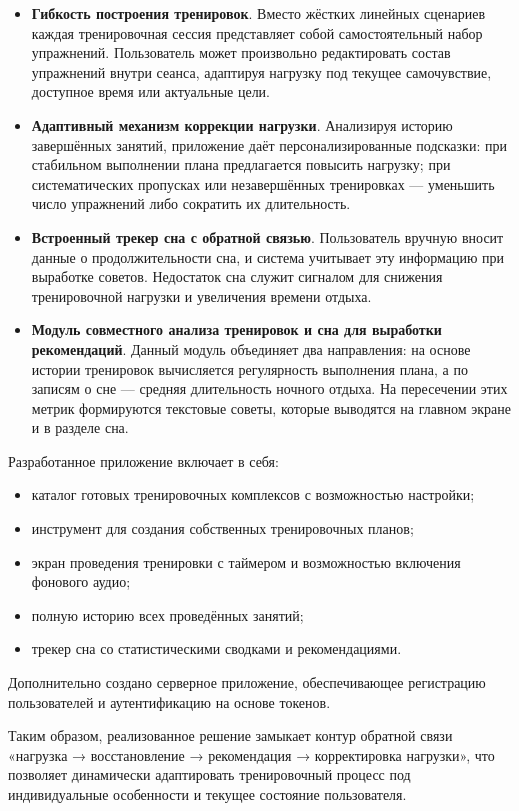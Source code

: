 \begin{itemize}
    \item \textbf{Гибкость построения тренировок}. Вместо жёстких линейных сценариев каждая тренировочная сессия представляет собой самостоятельный набор упражнений. Пользователь может произвольно редактировать состав упражнений внутри сеанса, адаптируя нагрузку под текущее самочувствие, доступное время или актуальные цели.
    
    \item \textbf{Адаптивный механизм коррекции нагрузки}. Анализируя историю завершённых занятий, приложение даёт персонализированные подсказки: при стабильном выполнении плана предлагается повысить нагрузку; при систематических пропусках или незавершённых тренировках — уменьшить число упражнений либо сократить их длительность.
    
    \item \textbf{Встроенный трекер сна с обратной связью}. Пользователь вручную вносит данные о продолжительности сна, и система учитывает эту информацию при выработке советов. Недостаток сна служит сигналом для снижения тренировочной нагрузки и увеличения времени отдыха.
    
    \item \textbf{Модуль совместного анализа тренировок и сна для выработки рекомендаций}. Данный модуль объединяет два направления: на основе истории тренировок вычисляется регулярность выполнения плана, а по записям о сне — средняя длительность ночного отдыха. На пересечении этих метрик формируются текстовые советы, которые выводятся на главном экране и в разделе сна.
\end{itemize}

Разработанное приложение включает в себя:
\begin{itemize}
    \item каталог готовых тренировочных комплексов с возможностью настройки;
    \item инструмент для создания собственных тренировочных планов;
    \item экран проведения тренировки с таймером и возможностью включения фонового аудио;
    \item полную историю всех проведённых занятий;
    \item трекер сна со статистическими сводками и рекомендациями.
\end{itemize}

Дополнительно создано серверное приложение, обеспечивающее регистрацию пользователей и аутентификацию на основе токенов.

Таким образом, реализованное решение замыкает контур обратной связи «нагрузка → восстановление → рекомендация → корректировка нагрузки», что позволяет динамически адаптировать тренировочный процесс под индивидуальные особенности и текущее состояние пользователя.